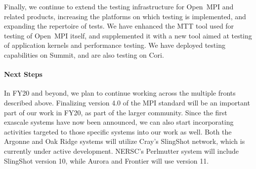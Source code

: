 Finally, we continue to extend the testing infrastructure for Open~MPI and related products, increasing the platforms on which testing is implemented, and expanding the repertoire of tests.  We have enhanced the MTT tool used for testing of Open~MPI itself, and supplemented it with a new tool aimed at testing of application kernels and performance testing.  We have deployed testing capabilities on Summit, and are also testing on Cori.


\paragraph{Next Steps}
In FY20 and beyond, we plan to continue working across the multiple fronts described above.  Finalizing version 4.0 of the MPI standard will be an important part of our work in FY20, as part of the larger community.  Since the first exascale systems have now been announced, we can also start incorporating activities targeted to those specific systems into our work as well.  Both the Argonne and Oak Ridge systems will utilize Cray's SlingShot network, which is currently under active development.  NERSC's Perlmutter system will include SlingShot version 10, while Aurora and Frontier will use version 11.
